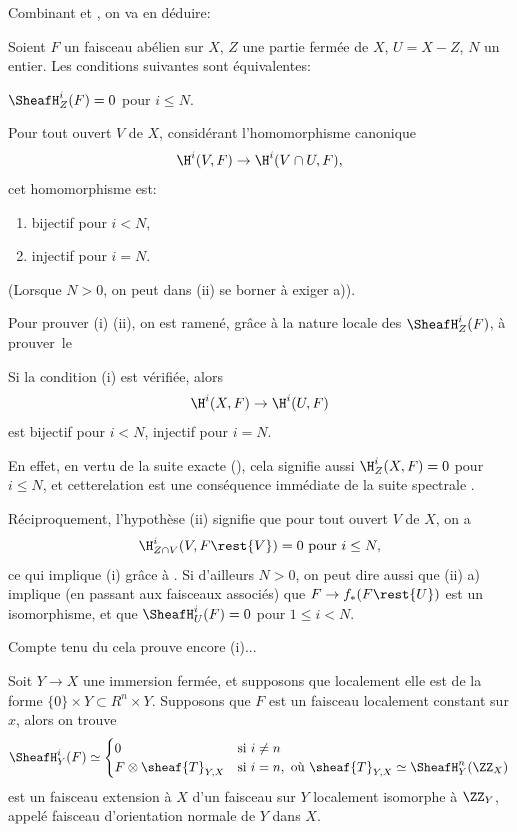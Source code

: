 Combinant  et , on va en d\'eduire:

\begin{proposition} \label{I.2.13}
Soient $F$ un faisceau ab\'elien sur $X$, $Z$ une partie ferm\'ee de $X$, $U=X-Z$, $N$ un entier. Les conditions suivantes sont \'equivalentes:
\begin{enumeratei}
\item
$\SheafH^i_Z(F)=0$ pour $i\leq N$.
\item
Pour tout ouvert $V$ de $X$, consid\'erant l'homomorphisme canonique
$$
\H^i(V, F) \to \H^i(V\cap U, F),$$
cet homomorphisme est:
\begin{enumerate}
\item[\textup{a)}] bijectif pour $i<N$,
\item[\textup{b)}] injectif pour $i=N$.
\end{enumerate}
\end{enumeratei}
\noindent
(Lorsque $N>0$, on peut dans \textup{(ii)} se borner \`a exiger \textup{a)}).
\end{proposition}

Pour prouver (i) \ALORS (ii), on est ramen\'e, gr\^ace \`a la nature locale des $\SheafH_Z^i(F)$, \`a prouver~le

\begin{corollaire} \label{I.2.14}
Si la condition  (i) est v\'erifi\'ee, alors
$$
\H^i(X, F) \to \H^i(U, F)$$
est bijectif pour $i<N$, injectif pour $i=N$.
\end{corollaire}

En effet, en vertu de la suite exacte (), cela signifie aussi $\H^i_Z(X, F)=0$ pour $i\leq N$, et cette\pageoriginale relation est une cons\'equence imm\'ediate de la suite spectrale .

R\'eciproquement, l'hypoth\`ese  (ii) signifie que pour tout ouvert $V$ de $X$, on a
$$
\H^i_{Z\cap V}(V, F\rest{V}) =0 \text{ pour } i\leq N,
$$
ce qui implique  (i) gr\^ace \`a . Si d'ailleurs $N>0$, on peut dire aussi que (ii) a) implique (en passant aux faisceaux associ\'es) que $F \to f_*(F\rest{U})$ est un isomorphisme, et que $\SheafH_U^i(F)=0 $ pour $1\leq i<N$.

Compte tenu du  cela prouve encore  (i)...

\begin{remarquestar}
Soit $Y \to X$ une immersion ferm\'ee, et supposons que localement elle est de la forme $\{0\}\times Y \subset R^n \times Y$. Supposons que $F$ est un faisceau localement constant sur $x$, alors on trouve
\begin{equation} \label{eq:I.30}
\SheafH_Y^i (F)\simeq
\begin{cases}
0 &\text{si } i \neq n\\
F\otimes \sheaf{T}_{Y, X}& \text{si } i=n, \text{ o\`u } \sheaf{T}_{Y, X} \simeq \SheafH_Y^n(\ZZ_X)
\end{cases}
\end{equation}
est un faisceau extension \`a $X$ d'un faisceau sur $Y$ localement isomorphe \`a $\ZZ_Y$, appel\'e \og faisceau d'orientation normale de $Y$ dans $X$\fg.
\end{remarquestar}


